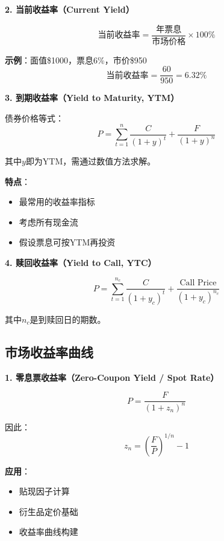 \textbf{2. 当前收益率（Current Yield）}

\begin{equation}
\text{当前收益率} = \frac{\text{年票息}}{\text{市场价格}} \times 100\%
\end{equation}

\textbf{示例}：面值\$1000，票息6\%，市价\$950
\begin{equation}
\text{当前收益率} = \frac{60}{950} = 6.32\%
\end{equation}

\textbf{3. 到期收益率（Yield to Maturity, YTM）}

债券价格等式：
\begin{equation}
P = \sum_{t=1}^{n} \frac{C}{(1+y)^t} + \frac{F}{(1+y)^n}
\end{equation}

其中$y$即为YTM，需通过数值方法求解。

\textbf{特点}：
\begin{itemize}
    \item 最常用的收益率指标
    \item 考虑所有现金流
    \item 假设票息可按YTM再投资
\end{itemize}

\textbf{4. 赎回收益率（Yield to Call, YTC）}

\begin{equation}
P = \sum_{t=1}^{n_c} \frac{C}{(1+y_c)^t} + \frac{\text{Call Price}}{(1+y_c)^{n_c}}
\end{equation}

其中$n_c$是到赎回日的期数。

\subsection{市场收益率曲线}

\textbf{1. 零息票收益率（Zero-Coupon Yield / Spot Rate）}

\begin{equation}
P = \frac{F}{(1+z_n)^n}
\end{equation}

因此：
\begin{equation}
z_n = \left(\frac{F}{P}\right)^{1/n} - 1
\end{equation}

\textbf{应用}：
\begin{itemize}
    \item 贴现因子计算
    \item 衍生品定价基础
    \item 收益率曲线构建
\end{itemize}

